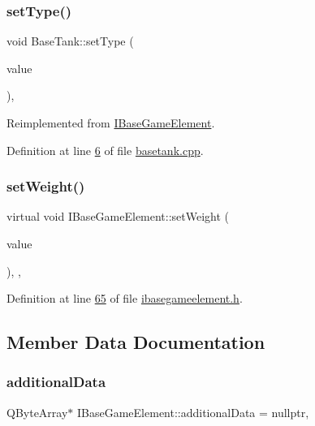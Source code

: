 \subsubsection{\texorpdfstring{set\+Type()}{setType()}}
{\footnotesize\ttfamily void Base\+Tank\+::set\+Type (\begin{DoxyParamCaption}\item[{int}]{value }\end{DoxyParamCaption})\hspace{0.3cm}{\ttfamily [override]}, {\ttfamily [virtual]}}



Reimplemented from \hyperlink{a00137_a324cba2176155a50b5a2239eb0a8b6a0}{I\+Base\+Game\+Element}.



Definition at line \hyperlink{a00038_source_l00006}{6} of file \hyperlink{a00038_source}{basetank.\+cpp}.

\mbox{\label{a00137_a4b5e42aa7985c9bf959f0275cbc1bac7}} 
\subsubsection{\texorpdfstring{set\+Weight()}{setWeight()}}
{\footnotesize\ttfamily virtual void I\+Base\+Game\+Element\+::set\+Weight (\begin{DoxyParamCaption}\item[{\hyperlink{a00161}{Infinity\+Double} $\ast$}]{value }\end{DoxyParamCaption})\hspace{0.3cm}{\ttfamily [inline]}, {\ttfamily [virtual]}, {\ttfamily [inherited]}}



Definition at line \hyperlink{a00047_source_l00065}{65} of file \hyperlink{a00047_source}{ibasegameelement.\+h}.



\subsection{Member Data Documentation}
\mbox{\label{a00137_a4d3547697d3bd0c2d65c83b07b3f8f91}} 
\subsubsection{\texorpdfstring{additional\+Data}{additionalData}}
{\footnotesize\ttfamily Q\+Byte\+Array$\ast$ I\+Base\+Game\+Element\+::additional\+Data = nullptr\hspace{0.3cm}{\ttfamily [protected]}, {\ttfamily [inherited]}}



